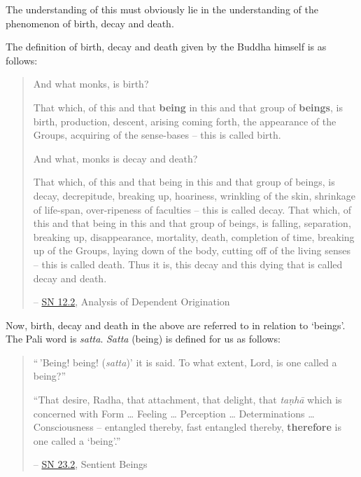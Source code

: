 The understanding of this must obviously lie in the understanding of the phenomenon of birth, decay and death.

The definition of birth, decay and death given by the Buddha himself is as follows:

\begin{quote}
And what monks, is birth?

That which, of this and that \textbf{being} in this and that group of \textbf{beings}, is birth, production, descent, arising coming forth, the appearance of the Groups, acquiring of the sense-bases -- this is called birth.

And what, monks is decay and death?

That which, of this and that being in this and that group of beings, is decay, decrepitude, breaking up, hoariness, wrinkling of the skin, shrinkage of life-span, over-ripeness of faculties -- this is called decay. That which, of this and that being in this and that group of beings, is falling, separation, breaking up, disappearance, mortality, death, completion of time, breaking up of the Groups, laying down of the body, cutting off of the living senses -- this is called death. Thus it is, this decay and this dying that is called decay and death.

 -- \href{https://suttacentral.net/sn12.2/en/bodhi}{SN 12.2}, Analysis of Dependent Origination
\end{quote}

Now, birth, decay and death in the above are referred to in relation to `beings'. The Pali word is \emph{satta}. \emph{Satta} (being) is defined for us as follows:

\begin{quote}
``\,'Being! being! (\emph{satta})' it is said. To what extent, Lord, is one called a being?''

``That desire, Radha, that attachment, that delight, that \emph{taṇhā} which is concerned with Form \ldots\hspace{0pt} Feeling \ldots\hspace{0pt} Perception \ldots\hspace{0pt} Determinations \ldots\hspace{0pt} Consciousness -- entangled thereby, fast entangled thereby, \textbf{therefore} is one called a `being'.''

 -- \href{https://suttacentral.net/sn23.2/en/sujato}{SN 23.2}, Sentient Beings
\end{quote}

